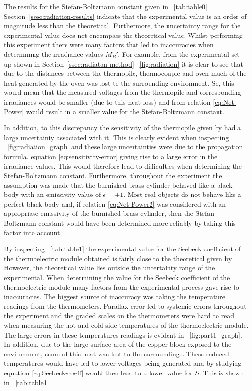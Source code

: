 \documentclass{article}
\newcommand{\figref}[2][\figurename~]{#1\ref{#2}}
\newcommand{\tabref}[2][\tablename~]{#1\ref{#2}}
\newcommand{\secref}[2][Section~]{#1\ref{#2}}
\begin{document}
The results for the Stefan-Boltzmann constant given in \tabref{tab:table0} \secref{ssec:radiation-results} indicate that the experimental value is an order of magnitude less than the theoretical. Furthermore, the uncertainty range for the experimental value does not encompass the theoretical value. Whilst performing this experiment there were many factors that led to inaccuracies when determining the irradiance values $M_B'$. For example, from the experimental set-up shown in \secref{ssec:radiaton-method} \figref{fig:radiation} it is clear to see that due to the distances between the thermopile, thermocouple and oven much of the heat generated by the oven was lost to the surrounding environment. So, this would mean that the measured voltages from the thermopile and corresponding irradiances would be smaller (due to this heat loss) and from relation \eqref{eq:Net-Power} would result in a smaller value for the Stefan-Boltzmann constant. 

\vspace{2mm}
\noindent
In addition, to this discrepancy the sensitivity of the thermopile given by \cite{Paper01} had a large uncertainty associated with it. This is clearly evident when inspecting \figref{fig:radiation_graph} and these large uncertainties were due to the propagation formula, equation \eqref{eq:sensitivity-error} giving rise to a large error in the irradiance values. This would therefore lead to difficulties when determining the Stefan-Boltzmann constant. Furthermore, throughout the experiment the assumption was made that the burnished brass cylinder behaved like a black body with an emissivity value of $\epsilon = +1$. Most real objects do not behave like a perfect black body and, if relation \eqref{eq:Net-Power2} was considered with an appropriate emissivity of the burnished brass cylinder, then the Stefan-Boltzmann constant would have been determined more reliably by taking this factor into account. 

\vspace{2mm}
\noindent
By inspecting \tabref{tab:table1} the experimental value for the Seebeck coefficient of the thermoelectric module obtained is fairly close to the theoretical given by \cite{Paper02}. However, the theoretical value lies outside the uncertainty range of the experimental. When determining the value for the Seebeck coefficient of the thermoelectric module many factors from the experimental process gave rise to inaccuracies. The biggest source of inaccuracy was taking the temperature readings from the thermometers. Parallax error led to systemic errors throughout the experiment and the graded scales on the thermometers were hard to read when measuring the hot and cold side temperatures of the thermoelectric module. The large errors in these temperatures readings is evident in \figref{fig:part1_graph}. In addition, due to the large surface area of the copper block exposed to the environment, some of this heat was lost to the surroundings. These reduced temperatures would have led to lower voltages being generated and by studying equation \eqref{eq:Seebeck-coeff} would then lead to a lower value for $S$. This is shown in \tabref{tab:table1}.
\end{document}
